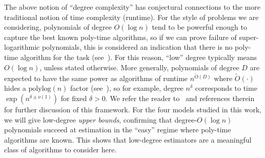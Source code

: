 \documentclass[11pt]{article}
\begin{document}
The above notion of ``degree complexity'' has conjectural connections to the more traditional notion of time complexity (runtime). For the style of problems we are considering, polynomials of degree $O(\log n)$ tend to be powerful enough to capture the best known poly-time algorithms, so if we can prove failure of super-logarithmic polynomials, this is considered an indication that there is no poly-time algorithm for the task (see~\cite[Conjecture~2.2.4]{hopkins-thesis}). For this reason, ``low'' degree typically means $O(\log n)$, unless stated otherwise. More generally, polynomials of degree $D$ are expected to have the same power as algorithms of runtime $n^{\tilde{O}(D)}$ where $\tilde{O}(\cdot)$ hides a $\mathrm{polylog}(n)$ factor (see~\cite[Hypothesis~2.1.5]{hopkins-thesis}), so for example, degree $n^\delta$ corresponds to time $\exp(n^{\delta \pm o(1)})$ for fixed $\delta > 0$. We refer the reader to~\cite{SW-estimation} and references therein for further discussion of this framework. For the four models studied in this work, we will give low-degree \emph{upper bounds}, confirming that degree-$O(\log n)$ polynomials succeed at estimation in the ``easy'' regime where poly-time algorithms are known. This shows that low-degree estimators are a meaningful class of algorithms to consider here.
\end{document}
